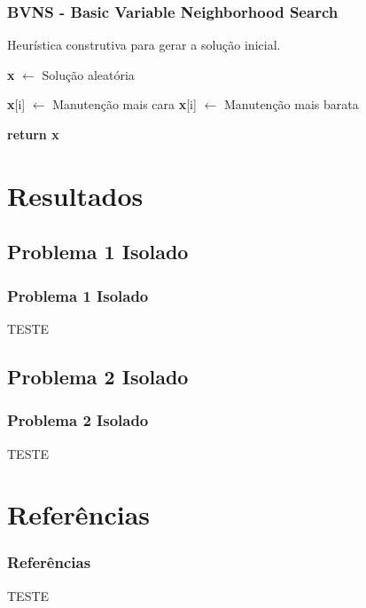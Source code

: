 \documentclass{beamer}
\begin{document}
    \begin{frame}
        \frametitle{BVNS - Basic Variable Neighborhood Search}
        \begin{algorithm}[H]
            \caption{Heurística construtiva para gerar a solução inicial.}\label{alg:sol-inicial}
            \begin{algorithmic}[1]

            \State \textbf{x} $\gets$ Solução aleatória

                    \State \textbf{x}[i] $\gets$ Manutenção mais cara
                \Else
                    \State \textbf{x}[i] $\gets$ Manutenção mais barata
                \EndIf
            \EndFor
               
            \Statex
            \State \textbf{return x} 
            \EndProcedure 
            \end{algorithmic}
        \end{algorithm}
    \end{frame}

\section{Resultados}

\subsection{Problema 1 Isolado}
    \begin{frame}
        \frametitle{Problema 1 Isolado}

        \begin{center}
            TESTE
        \end{center}
    \end{frame}

    \subsection{Problema 2 Isolado}
    \begin{frame}
        \frametitle{Problema 2 Isolado}

        \begin{center}
            TESTE
        \end{center}
    \end{frame}


\section{Referências}

    \begin{frame}
        \frametitle{Referências}

        \begin{center}
            TESTE
        \end{center}
    \end{frame}
\end{document}

